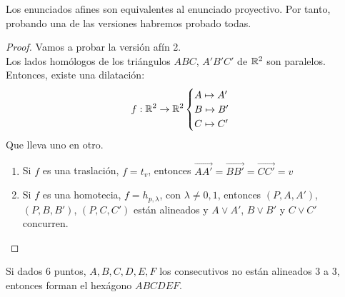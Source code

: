\begin{nota}
	Los enunciados afines son equivalentes al enunciado proyectivo. Por tanto, probando una de las versiones habremos probado todas.
\end{nota}
\begin{proof}
	Vamos a probar la versión afín 2.\\
	Los lados homólogos de los triángulos $ABC$, $A'B'C'$ de $\mathbb{R}^2$ son paralelos. Entonces, existe una dilatación:
	\[
	f: \mathbb{R}^2 \to \mathbb{R}^2 \begin{cases}
	A \mapsto A'\\
	B \mapsto B'\\
	C \mapsto C'

\end{cases}
	\]
	Que lleva uno en otro.
	\begin{enumerate}
	\item Si $f$ es una traslación, $f = t_v$, entonces $\vec{AA'}= \vec{BB'} = \vec{CC'}=v$
	\item Si $f$ es una homotecia, $f= h_{p,\lambda}$, con $\lambda \ne 0, 1$, entonces $(P,A,A')$, $(P,B,B')$, $(P,C,C')$ están alineados y $A\vee A'$, $B \vee B'$ y $C \vee C'$ concurren.
\end{enumerate}
\end{proof}

\begin{ndef}[Hexágono]
    Si dados 6 puntos, $A,B,C,D,E,F$ los consecutivos no están alineados 3 a 3, entonces forman el hexágono $ABCDEF$.
\end{ndef}

